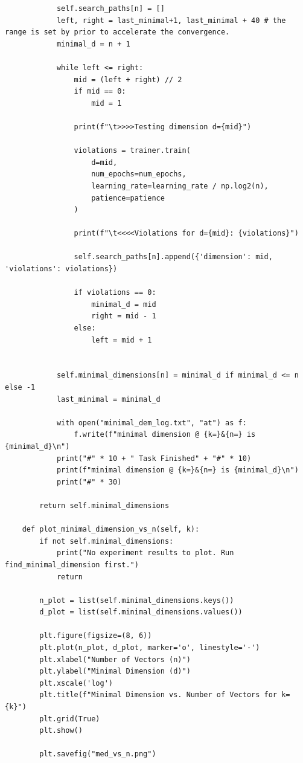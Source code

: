 \begin{lstlisting}
            self.search_paths[n] = []
            left, right = last_minimal+1, last_minimal + 40 # the range is set by prior to accelerate the convergence.
            minimal_d = n + 1

            while left <= right:
                mid = (left + right) // 2
                if mid == 0:
                    mid = 1

                print(f"\t>>>>Testing dimension d={mid}")

                violations = trainer.train(
                    d=mid,
                    num_epochs=num_epochs,
                    learning_rate=learning_rate / np.log2(n),
                    patience=patience
                )

                print(f"\t<<<<Violations for d={mid}: {violations}")

                self.search_paths[n].append({'dimension': mid, 'violations': violations})

                if violations == 0:
                    minimal_d = mid
                    right = mid - 1
                else:
                    left = mid + 1


            self.minimal_dimensions[n] = minimal_d if minimal_d <= n else -1
            last_minimal = minimal_d

            with open("minimal_dem_log.txt", "at") as f:
                f.write(f"minimal dimension @ {k=}&{n=} is {minimal_d}\n")
            print("#" * 10 + " Task Finished" + "#" * 10)
            print(f"minimal dimension @ {k=}&{n=} is {minimal_d}\n")
            print("#" * 30)

        return self.minimal_dimensions

    def plot_minimal_dimension_vs_n(self, k):
        if not self.minimal_dimensions:
            print("No experiment results to plot. Run find_minimal_dimension first.")
            return

        n_plot = list(self.minimal_dimensions.keys())
        d_plot = list(self.minimal_dimensions.values())

        plt.figure(figsize=(8, 6))
        plt.plot(n_plot, d_plot, marker='o', linestyle='-')
        plt.xlabel("Number of Vectors (n)")
        plt.ylabel("Minimal Dimension (d)")
        plt.xscale('log')
        plt.title(f"Minimal Dimension vs. Number of Vectors for k={k}")
        plt.grid(True)
        plt.show()

        plt.savefig("med_vs_n.png")


\end{lstlisting}
